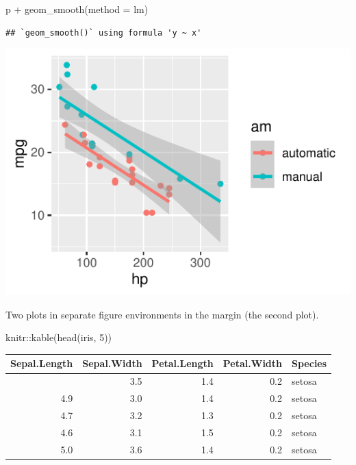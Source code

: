 \documentclass[]{tufte-handout}
\newenvironment{Shaded}{}{}
\newcommand{\AttributeTok}[1]{\textcolor[rgb]{0.49,0.56,0.16}{#1}}
\newcommand{\DecValTok}[1]{\textcolor[rgb]{0.25,0.63,0.44}{#1}}
\newcommand{\FunctionTok}[1]{\textcolor[rgb]{0.02,0.16,0.49}{#1}}
\newcommand{\NormalTok}[1]{#1}
\newcommand{\SpecialCharTok}[1]{\textcolor[rgb]{0.25,0.44,0.63}{#1}}
\newcommand{\StringTok}[1]{\textcolor[rgb]{0.25,0.44,0.63}{#1}}
\begin{document}
\begin{Shaded}
\begin{Highlighting}[]
\NormalTok{p }\SpecialCharTok{+} \FunctionTok{geom\_smooth}\NormalTok{(}\AttributeTok{method =} \StringTok{\textquotesingle{}lm\textquotesingle{}}\NormalTok{)}
\end{Highlighting}
\end{Shaded}

\begin{verbatim}
## `geom_smooth()` using formula 'y ~ x'
\end{verbatim}

\begin{marginfigure}
\includegraphics{tufte_files/figure-latex/fig-margin-separate-2} \caption[Two plots in separate figure environments in the margin (the second plot)]{Two plots in separate figure environments in the margin (the second plot).}\label{fig:fig-margin-separate-2}
\end{marginfigure}

\begin{Shaded}
\begin{Highlighting}[]
\NormalTok{knitr}\SpecialCharTok{::}\FunctionTok{kable}\NormalTok{(}\FunctionTok{head}\NormalTok{(iris, }\DecValTok{5}\NormalTok{))}
\end{Highlighting}
\end{Shaded}

\begin{longtable}[]{@{}rrrrl@{}}
\toprule\noalign{}
Sepal.Length & Sepal.Width & Petal.Length & Petal.Width & Species \\
\midrule\noalign{}
\endhead
\bottomrule\noalign{}
\endlastfoot
5.1 & 3.5 & 1.4 & 0.2 & setosa \\
4.9 & 3.0 & 1.4 & 0.2 & setosa \\
4.7 & 3.2 & 1.3 & 0.2 & setosa \\
4.6 & 3.1 & 1.5 & 0.2 & setosa \\
5.0 & 3.6 & 1.4 & 0.2 & setosa \\
\end{longtable}
\end{document}
